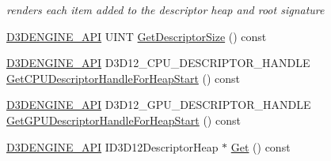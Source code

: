 \begin{DoxyCompactItemize}
\begin{DoxyCompactList}\small\item\em renders each item added to the descriptor heap and root signature \end{DoxyCompactList}\item 
\mbox{\hyperlink{stdafx_8h_a8ee2d990c5dfba7794dd2b60741d7722}{D3\+D\+E\+N\+G\+I\+N\+E\+\_\+\+A\+PI}} U\+I\+NT \mbox{\hyperlink{class_descriptor_heap_manager_ac772aa7fc2f22d105a2ecd02367fc1b0}{Get\+Descriptor\+Size}} () const
\item 
\mbox{\hyperlink{stdafx_8h_a8ee2d990c5dfba7794dd2b60741d7722}{D3\+D\+E\+N\+G\+I\+N\+E\+\_\+\+A\+PI}} D3\+D12\+\_\+\+C\+P\+U\+\_\+\+D\+E\+S\+C\+R\+I\+P\+T\+O\+R\+\_\+\+H\+A\+N\+D\+LE \mbox{\hyperlink{class_descriptor_heap_manager_a1d2f105a289fc558395f3546d2c018ff}{Get\+C\+P\+U\+Descriptor\+Handle\+For\+Heap\+Start}} () const
\item 
\mbox{\hyperlink{stdafx_8h_a8ee2d990c5dfba7794dd2b60741d7722}{D3\+D\+E\+N\+G\+I\+N\+E\+\_\+\+A\+PI}} D3\+D12\+\_\+\+G\+P\+U\+\_\+\+D\+E\+S\+C\+R\+I\+P\+T\+O\+R\+\_\+\+H\+A\+N\+D\+LE \mbox{\hyperlink{class_descriptor_heap_manager_a9d1ca4a074100e3ab22f28402fbaa377}{Get\+G\+P\+U\+Descriptor\+Handle\+For\+Heap\+Start}} () const
\item 
\mbox{\hyperlink{stdafx_8h_a8ee2d990c5dfba7794dd2b60741d7722}{D3\+D\+E\+N\+G\+I\+N\+E\+\_\+\+A\+PI}} I\+D3\+D12\+Descriptor\+Heap $\ast$ \mbox{\hyperlink{class_descriptor_heap_manager_a189cfd693db1cb7bdd5497dacd2044a3}{Get}} () const
\end{DoxyCompactItemize}
